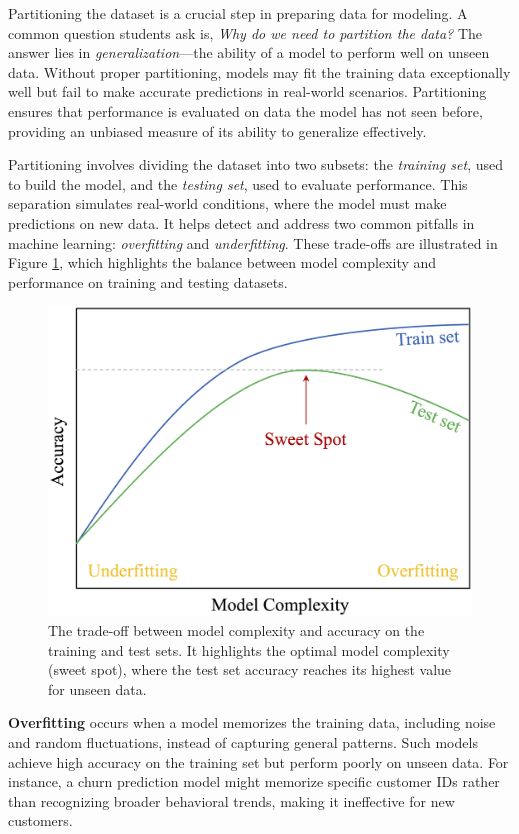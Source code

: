 \documentclass[
  11pt,
]{book}
\theoremstyle{definition}
\theoremstyle{definition}
\theoremstyle{definition}
\theoremstyle{definition}
\theoremstyle{remark}
\begin{document}
Partitioning the dataset is a crucial step in preparing data for modeling. A common question students ask is, \emph{Why do we need to partition the data?} The answer lies in \emph{generalization}---the ability of a model to perform well on unseen data. Without proper partitioning, models may fit the training data exceptionally well but fail to make accurate predictions in real-world scenarios. Partitioning ensures that performance is evaluated on data the model has not seen before, providing an unbiased measure of its ability to generalize effectively.

Partitioning involves dividing the dataset into two subsets: the \emph{training set}, used to build the model, and the \emph{testing set}, used to evaluate performance. This separation simulates real-world conditions, where the model must make predictions on new data. It helps detect and address two common pitfalls in machine learning: \emph{overfitting} and \emph{underfitting}. These trade-offs are illustrated in Figure \ref{fig:model-complexity}, which highlights the balance between model complexity and performance on training and testing datasets.

\begin{figure}[H]

{\centering \includegraphics[width=0.65\linewidth]{images/ch6_model_complexity} 

}

\caption{The trade-off between model complexity and accuracy on the training and test sets. It highlights the optimal model complexity (sweet spot), where the test set accuracy reaches its highest value for unseen data.}\label{fig:model-complexity}
\end{figure}

\textbf{Overfitting} occurs when a model memorizes the training data, including noise and random fluctuations, instead of capturing general patterns. Such models achieve high accuracy on the training set but perform poorly on unseen data. For instance, a churn prediction model might memorize specific customer IDs rather than recognizing broader behavioral trends, making it ineffective for new customers.
\end{document}
